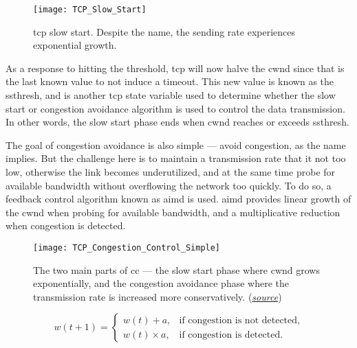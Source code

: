 \begin{figure}[H]
    \centering
    \texttt{[image: TCP\_Slow\_Start]}
    \captionsetup{width=0.4\textwidth}
    \caption{\gls{tcp} slow start. Despite the name, the sending rate experiences exponential growth. }
\end{figure}

As a response to hitting the threshold, \gls{tcp} will now halve the \gls{cwnd} since that is the last known value to not induce a timeout. This new value is known as the \gls{ssthresh}, and is another \gls{tcp} state variable used to determine whether the slow start or congestion avoidance algorithm is used to control the data transmission. In other words, the slow start phase ends when \gls{cwnd} reaches or exceeds \gls{ssthresh}.

The goal of congestion avoidance is also simple --- avoid congestion, as the name implies. But the challenge here is to maintain a transmission rate that it not too low, otherwise the link becomes underutilized, and at the same time probe for available bandwidth without overflowing the network too quickly. To do so, a feedback control algorithm known as \gls{aimd} is used. \gls{aimd} provides linear growth of the \gls{cwnd} when probing for available bandwidth, and a multiplicative reduction when congestion is detected.

\begin{figure}[H]
    \centering
    \texttt{[image: TCP\_Congestion\_Control\_Simple]}
    \captionsetup{width=0.7\textwidth}
    \caption{The two main parts of \gls{cc} --- the slow start phase where \gls{cwnd} grows exponentially, and the congestion avoidance phase where the transmission rate is increased more conservatively. (\href{https://hpbn.co/building-blocks-of-tcp/}{\textit{source}})}
\end{figure}


\begin{equation} \label{eq:aimd}
    w(t + 1) = \begin{cases}
        w(t) + a, & \text{if congestion is not detected},\\
        w(t) \times a, & \text{if congestion is detected}.
    \end{cases}
\end{equation}





